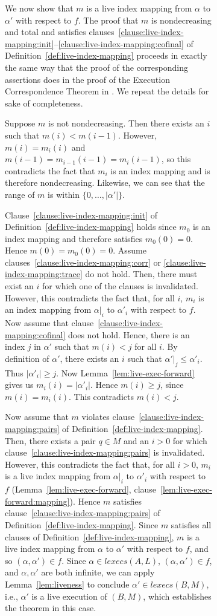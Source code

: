 \documentclass[11pt]{article}
\newcommand{\al}{\alpha}
\newcommand{\execs}{\mathit{lexecs}}
\begin{document}
\begin{figure}[htb]
\begin{figure}[htb]
We now show that $m$ is a live index mapping from $\al$ to $\al'$ with
respect to $f$. The proof that $m$ is nondecreasing and total and
satisfies
clauses~\ref{clause:live-index-mapping:init}--\ref{clause:live-index-mapping:cofinal}
of Definition~\ref{def:live-index-mapping} proceeds in exactly the
same way that the proof of the corresponding assertions does in the proof of the
Execution Correspondence Theorem in \cite{GSSL93}.
We repeat the details for sake of completeness.

Suppose $m$ is not nondecreasing. Then there exists an
$i$ such that $m(i) < m(i-1)$. However, $m(i) = m_i(i)$ and $m(i-1) =
m_{i-1}(i-1) = m_i(i-1)$, so this contradicts the fact that $m_i$ is
an index mapping and is therefore nondecreasing. Likewise, we can see
that the range of $m$ is within $\{0,\ldots,|\al'|\}$.

Clause~\ref{clause:live-index-mapping:init} of
Definition~\ref{def:live-index-mapping} holds since $m_0$ is an index
mapping and therefore satisfies $m_0(0) =
0$. Hence $m(0) = m_0(0) = 0$.
Assume clauses~\ref{clause:live-index-mapping:corr} or
\ref{clause:live-index-mapping:trace} do not hold. Then, there must exist
an $i$ for which one of the clauses is invalidated. However, this
contradicts the fact that, for all $i$, $m_i$ is an index mapping from $\al|_i$ to
$\al'_i$ with respect to $f$.
Now assume that clause~\ref{clause:live-index-mapping:cofinal} does
not hold. Hence, there is an index $j$ in $\al'$ such that $m(i) < j$
for all $i$. By definition of $\al'$, there exists an $i$ such that
$\al'|_j \leq \al'_i$. Thus  $|\al'_i| \geq j$.
 Now Lemma~\ref{lem:live-exec-forward} gives us
$m_i(i) = |\al'_i|$. Hence $m(i) \geq j$, since $m(i) =
m_i(i)$. This contradicts $m(i) < j$.


Now assume that $m$ violates
clause~\ref{clause:live-index-mapping:pairs} of
Definition~\ref{def:live-index-mapping}. Then, there exists a pair $q
\in M$ and an $i > 0$ for which
clause~\ref{clause:live-index-mapping:pairs} is invalidated.  However,
this contradicts the fact that, for all $i > 0$, $m_i$ is a live index
mapping from $\al|_i$ to $\al'_i$ with respect to $f$
(Lemma~\ref{lem:live-exec-forward}, clause~\ref{lem:live-exec-forward:mapping}).
Hence $m$ satisfies clause~\ref{clause:live-index-mapping:pairs} of
Definition~\ref{def:live-index-mapping}.  Since $m$ satisfies all
clauses of Definition~\ref{def:live-index-mapping}, $m$ is a live
index mapping from $\al$ to $\al'$ with respect to $f$, and so
$(\al,\al') \in f$.
Since $\al \in \execs(A,L)$, $(\al,\al') \in f$, and $\al, \al'$ are both
infinite, we can apply Lemma~\ref{lem:liveness} to conclude $\al' \in
\execs(B,M)$, i.e., $\al'$ is a live execution of $(B,M)$, which
establishes the theorem in this case.



\end{figure}
\end{figure}
\end{document}
